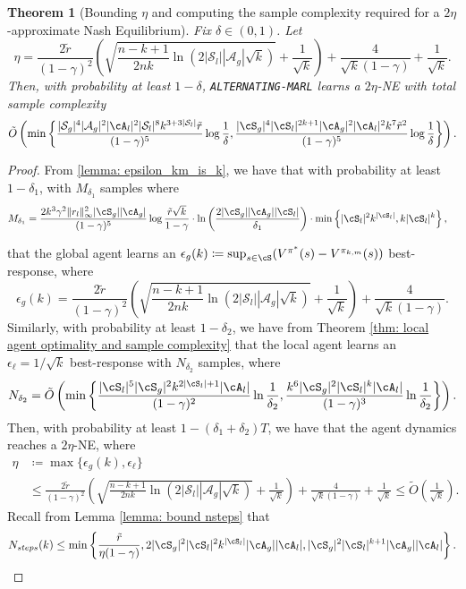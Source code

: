 \documentclass{article}
\theoremstyle{plain}
\newtheorem{theorem}{Theorem}[section]
\theoremstyle{definition}
\begin{document}
\begin{theorem}[Bounding $\eta$ and computing the sample complexity required for a $2\eta$-approximate Nash Equilibrium] Fix $\delta\in(0,1)$. Let \[\eta = \frac{2\tilde{r}}{(1-\gamma)^2}\left(\sqrt{\frac{n-k+1}{2nk} \ln(2|\mathcal{S}_l||\mathcal{A}_g|\sqrt{k})} +  \frac{1}{\sqrt{k}}\right) + \frac{4}{\sqrt{k}(1-\gamma)} + \frac{1}{\sqrt{k}}.\]
Then, with probability at least $1-\delta$, \emph{\texttt{ALTERNATING-MARL}} learns a  $2\eta$-NE with total sample complexity
\[\tilde{O}\left(\min\left\{\frac{|\mathcal{S}_g|^4|\mathcal{A}_g|^2 |\cA_l|^2 |\mathcal{S}_l|^8 k^{3 + 3|\mathcal{S}_l| }\tilde{r}}{(1-\gamma)^5}\log \frac1\delta, \frac{|\cS_g|^4 |\cS_l|^{2k+1} |\cA_g|^2 |\cA_l|^2 k^7 \tilde{r}^2}{(1-\gamma)^5} \log \frac{1}{\delta} \right\}\right).\]
\end{theorem}
\begin{proof}
From \cref{lemma: epsilon_km_is_k}, we have that with probability at least $1-\delta_1$, with $M_{\delta_1}$ samples where 
\begin{align*}M_{\delta_1} &= \frac{2k^3\gamma^2\|r_l\|^2_\infty |\cS_g| |\cA_g|}{(1-\gamma)^5}\log \frac{\tilde{r}\sqrt{k}}{1-\gamma} \cdot \ln \left(\frac{2  |\cS_g||\cA_g| |\cS_l|}{\delta_1}\right)\cdot \min\left\{|\cS_l|^2  k^{|\cS_l|} ,  k |\cS_l|^k \right\},
\end{align*}


that the global agent learns an $\epsilon_g(k)\coloneqq \sup_{s\in \cS}(V^{\pi^*}(s) - V^{\pi_{k,m}}(s))$ best-response, where
\[\epsilon_g(k) = \frac{2\tilde{r}}{(1-\gamma)^2}\left(\sqrt{\frac{n-k+1}{2nk} \ln(2|\mathcal{S}_l||\mathcal{A}_g|\sqrt{k})} +  \frac{1}{\sqrt{k}}\right) + \frac{4}{\sqrt{k}(1-\gamma)}.\]
Similarly, with probability at least $1-\delta_2$, we have from Theorem \ref{thm: local agent optimality and sample complexity} that the local agent learns an $\epsilon_\ell=1/\sqrt{k}$ best-response with $N_{\delta_2}$ samples, where
\begin{align*}N_{\delta_2} &= \tilde{O}\left(\min\left\{\frac{|\cS_l|^5|\cS_g|^2 k^{2|\cS_l|+1}|\cA_l|}{(1-\gamma)^2} \ln \frac1{\delta_2}, \frac{k^6  |\cS_g|^2 |\cS_l|^k |\cA_l|}{(1-\gamma)^3} \ln \frac1{\delta_2}\right\}\right).\\
\end{align*}
Then, with probability at least $1 - (\delta_1+\delta_2)T$, we have that the agent dynamics reaches a $2\eta$-NE, where 
\begin{align*}\eta &\coloneqq \max\{\epsilon_g(k), \epsilon_\ell\}\\
&\leq  \frac{2\tilde{r}}{(1-\gamma)^2}\left(\sqrt{\frac{n-k+1}{2nk} \ln(2|\mathcal{S}_l||\mathcal{A}_g|\sqrt{k})} +  \frac{1}{\sqrt{k}}\right) + \frac{4}{\sqrt{k}(1-\gamma)} + \frac{1}{\sqrt{k}} \leq \tilde{O}\left(\frac{1}{\sqrt{k}}\right).
\end{align*}
Recall from Lemma \ref{lemma: bound nsteps} that 
\[ N_{steps}(k) \leq \min\left\{\frac{\tilde{r}}{\eta(1-\gamma)}, 2|\cS_g|^2 |\cS_l|^2 k^{|\cS_l|} |\cA_g| |\cA_l|, |\cS_g|^2 |\cS_l|^{k+1} |\cA_g| |\cA_l| \right\}.\]


\end{proof}
\end{document}
